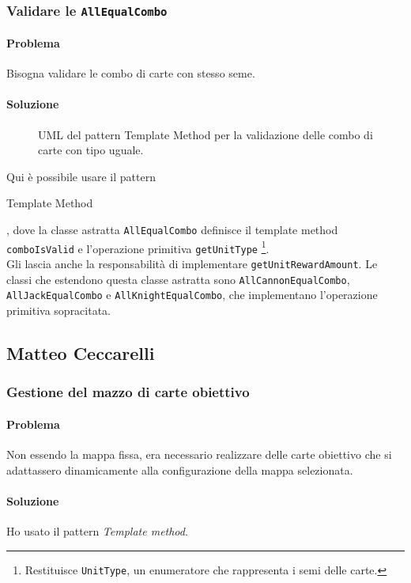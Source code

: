 \documentclass[a4paper,12pt]{report}
\begin{document}
\subsubsection{Validare le \texttt{AllEqualCombo}}
\paragraph{Problema}
Bisogna validare le combo di carte con stesso seme.
\paragraph{Soluzione}
\begin{figure}[H]
	\centering
	
	\caption{UML del pattern Template Method per la validazione delle combo di carte con tipo uguale.}
\end{figure}
Qui è possibile usare il pattern \begin{itshape}Template Method\end{itshape}, dove la classe astratta \texttt{AllEqualCombo} definisce il template method \texttt{comboIsValid} e l'operazione primitiva \texttt{getUnitType} \footnote{Restituisce \texttt{UnitType}, un enumeratore che rappresenta i semi delle carte.}.
\\
Gli lascia anche la responsabilità di implementare \texttt{getUnitRewardAmount}. Le classi che estendono questa classe astratta sono \texttt{AllCannonEqualCombo}, \texttt{AllJackEqualCombo} e \texttt{AllKnightEqualCombo}, che implementano l'operazione primitiva sopracitata.

\subsection{Matteo Ceccarelli}
\subsubsection{Gestione del mazzo di carte obiettivo}
\paragraph{Problema}
Non essendo la mappa fissa, era necessario realizzare delle carte obiettivo che si adattassero dinamicamente alla configurazione della mappa selezionata.
\paragraph{Soluzione}
Ho usato il pattern \textit{Template method}.
\end{document}
